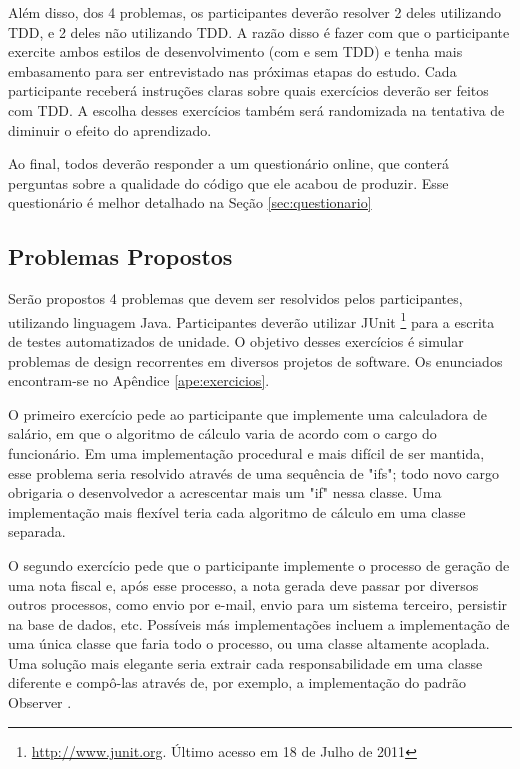 Além disso, dos 4 problemas, os participantes
deverão resolver 2 deles utilizando TDD, e 2 deles não utilizando TDD. A razão disso
é fazer com que o participante exercite ambos estilos de desenvolvimento (com e sem TDD)
e tenha mais embasamento para ser entrevistado nas próximas etapas do estudo. 
Cada participante receberá instruções claras sobre quais exercícios deverão ser feitos
com TDD. A escolha desses exercícios também será randomizada na tentativa de diminuir
o efeito do aprendizado.

Ao final, todos deverão responder a um questionário online, 
que conterá perguntas sobre a qualidade
do código que ele acabou de produzir. Esse questionário
é melhor detalhado na Seção \ref{sec:questionario}

\subsection{Problemas Propostos}
\label{sec:exercicios}

Serão propostos 4 problemas que devem ser resolvidos pelos participantes, utilizando
linguagem Java. Participantes deverão utilizar JUnit \footnote{\url{http://www.junit.org}. 
Último acesso em 18 de Julho de 2011} para a escrita de testes
automatizados de unidade. O objetivo desses exercícios é simular problemas de design 
recorrentes em diversos projetos de software. Os enunciados encontram-se no Apêndice 
\ref{ape:exercicios}.

O primeiro exercício pede ao participante que implemente uma calculadora de salário, em que
o algoritmo de cálculo varia de acordo com o cargo do funcionário. Em uma implementação
procedural e mais difícil de ser mantida, esse problema seria resolvido através de uma
sequência de "ifs"; todo novo cargo obrigaria o desenvolvedor a acrescentar mais um "if" 
nessa classe. Uma implementação mais flexível teria cada algoritmo de cálculo em uma 
classe separada.

O segundo exercício pede que o participante implemente o processo de geração de uma nota fiscal e, após
esse processo, a nota gerada deve passar por diversos outros processos, como envio por e-mail, envio
para um sistema terceiro, persistir na base de dados, etc. Possíveis más implementações incluem a 
implementação de uma única classe que faria todo o processo, ou uma classe altamente acoplada.
Uma solução mais elegante seria extrair cada responsabilidade em uma classe diferente e compô-las
através de, por exemplo, a implementação do padrão Observer \cite{gof}.

